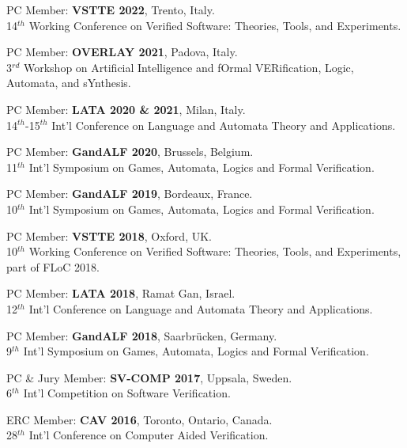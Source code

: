 \begin{resume}
\begin{list1}
\item
PC Member: {\bf \bf VSTTE 2022}, Trento, Italy.\\
14$^{th}$ Working Conference on Verified Software: Theories, Tools, and Experiments.\\  

\item
PC Member: {\bf OVERLAY 2021}, Padova, Italy.\\
3$^{rd}$  Workshop on Artificial Intelligence and fOrmal VERification, Logic, Automata, and sYnthesis.

\item
PC Member: {\bf LATA 2020 \& 2021}, Milan, Italy.\\
14$^{th}$-15$^{th}$  Int'l Conference on Language and Automata Theory and Applications.

\item
PC Member: {\bf GandALF 2020}, Brussels, Belgium.\\
11$^{th}$ Int'l Symposium on Games, Automata, Logics and Formal Verification.

\item
PC Member: {\bf GandALF 2019}, Bordeaux, France.\\
10$^{th}$ Int'l Symposium on Games, Automata, Logics and Formal Verification.


\item
PC Member: {\bf \bf VSTTE 2018}, Oxford, UK.\\
10$^{th}$ Working Conference on Verified Software: Theories, Tools, and Experiments,\\ 
part of FLoC 2018. 

\item
PC Member:  {\bf LATA 2018},   Ramat Gan, Israel.\\
12$^{th}$ Int'l Conference on Language and Automata Theory and Applications.

\item
PC Member: {\bf GandALF 2018}, Saarbr\"ucken, Germany.\\
9$^{th}$ Int'l Symposium on Games, Automata, Logics and Formal Verification.

\item
PC \& Jury Member: {\bf SV-COMP 2017}, Uppsala, Sweden.\\
6$^{th}$ Int'l Competition on Software Verification.

\item
ERC Member: {\bf CAV 2016}, Toronto, Ontario, Canada.\\
     28$^{th}$ Int'l Conference on Computer Aided Verification.


\end{list1}
\end{resume}
